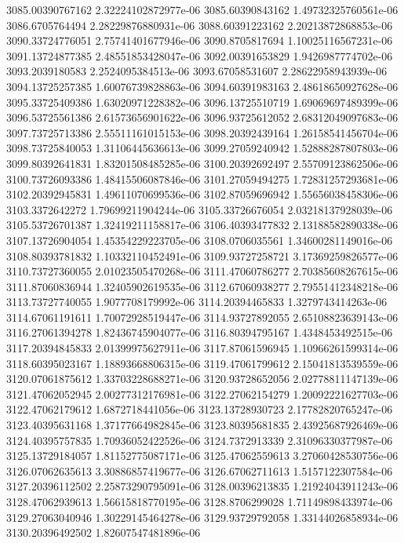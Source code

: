 {3085.00390767162 2.32224102872977e-06
3085.60390843162 1.49732325760561e-06
3086.6705764494 2.28229876880931e-06
3088.60391223162 2.20213872868853e-06
3090.33724776051 2.75741401677946e-06
3090.8705817694 1.10025116567231e-06
3091.13724877385 2.48551853428047e-06
3092.00391653829 1.9426987774702e-06
3093.2039180583 2.2524095384513e-06
3093.67058531607 2.28622958943939e-06
3094.13725257385 1.60076739828863e-06
3094.60391983163 2.48618650927628e-06
3095.33725409386 1.63020971228382e-06
3096.13725510719 1.69069697489399e-06
3096.53725561386 2.61573656901622e-06
3096.93725612052 2.68312049097683e-06
3097.73725713386 2.55511161015153e-06
3098.20392439164 1.26158541456704e-06
3098.73725840053 1.31106445636613e-06
3099.27059240942 1.52888287807803e-06
3099.80392641831 1.83201508485285e-06
3100.20392692497 2.55709123862506e-06
3100.73726093386 1.48415506087846e-06
3101.27059494275 1.72831257293681e-06
3102.20392945831 1.49611070699536e-06
3102.87059696942 1.55656038458306e-06
3103.3372642272 1.79699211904244e-06
3105.33726676054 2.03218137928039e-06
3105.53726701387 1.32419211158817e-06
3106.40393477832 2.13188582890338e-06
3107.13726904054 1.45354229223705e-06
3108.0706035561 1.34600281149016e-06
3108.80393781832 1.10332110452491e-06
3109.93727258721 3.17369259826577e-06
3110.73727360055 2.01023505470268e-06
3111.47060786277 2.70385608267615e-06
3111.87060836944 1.32405902619535e-06
3112.67060938277 2.79551412348218e-06
3113.73727740055 1.9077708179992e-06
3114.20394465833 1.3279743414263e-06
3114.67061191611 1.70072928519447e-06
3114.93727892055 2.65108823639143e-06
3116.27061394278 1.82436745904077e-06
3116.80394795167 1.4348453492515e-06
3117.20394845833 2.01399975627911e-06
3117.87061596945 1.10966261599314e-06
3118.60395023167 1.18893668806315e-06
3119.47061799612 2.15041813539559e-06
3120.07061875612 1.33703228688271e-06
3120.93728652056 2.02778811147139e-06
3121.47062052945 2.00277312176981e-06
3122.27062154279 1.20092221627703e-06
3122.47062179612 1.6872718441056e-06
3123.13728930723 2.17782820765247e-06
3123.40395631168 1.37177664982845e-06
3123.80395681835 2.43925687926469e-06
3124.40395757835 1.70936052422526e-06
3124.7372913339 2.31096330377987e-06
3125.13729184057 1.81152775087171e-06
3125.47062559613 3.27060428530756e-06
3126.07062635613 3.30886857419677e-06
3126.67062711613 1.5157122307584e-06
3127.20396112502 2.25873290795091e-06
3128.00396213835 1.21924043911243e-06
3128.47062939613 1.56615818770195e-06
3128.8706299028 1.71149898433974e-06
3129.27063040946 1.30229145464278e-06
3129.93729792058 1.33144026858934e-06
3130.20396492502 1.82607547481896e-06
}
